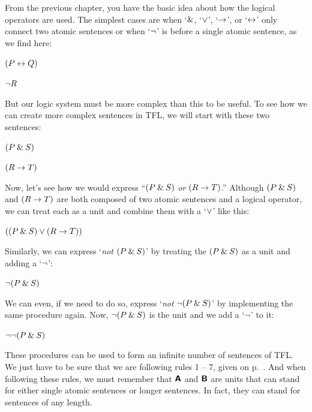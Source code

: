 From the previous chapter, you have the basic idea about how the logical operators are used. The simplest cases are when `$\mathbin{\&}$, `$\vee$', `$\rightarrow$', or `$\leftrightarrow$' only connect two atomic sentences or when `${\neg}$' is before a single atomic sentence, as we find here:  
\begin{earg}
\item[] $(P \leftrightarrow Q)$
\item[] ${\neg} R$
\end{earg}
But our logic system must be more complex than this to be useful. To see how we can create more complex sentences in TFL, we will start with these two sentences:
\begin{earg}
\item[] $(P \mathbin{\&} S)$
\item[] $(R \rightarrow T)$
\end{earg}
Now, let’s see how we would express ``$(P \mathbin{\&} S)$ \textit{or} $(R \rightarrow T)$.'' Although 
$(P \mathbin{\&} S)$ and
$(R \rightarrow T)$
are both composed of two atomic sentences and a logical operator, we can treat each as a unit and combine them with a `$\vee$’ like this:
\begin{earg}
\item[]$((P \mathbin{\&} S) \vee (R \rightarrow T))$
\end{earg}
\noindent Similarly, we can express `\textit{not} $(P \mathbin{\&} S)$' by treating the $(P \mathbin{\&} S)$ as a unit and adding a `${\neg}$’:
\begin{earg}
\item[] ${\neg}(P \mathbin{\&} S)$
\end{earg}
We can even, if we need to do so, express `\textit{not} ${\neg}(P \mathbin{\&} S)$' by implementing the same procedure again. Now, ${\neg}(P \mathbin{\&} S)$ is the unit and we add a `${\neg}$’ to it:
\begin{earg}
\item[] ${\neg}{\neg}(P \mathbin{\&} S)$
\end{earg}

These procedures can be used to form an infinite number of sentences of TFL. We just have to be sure that we are following rules 1 -- 7, given on p.~\pageref{TFLsentences}.  And when following these rules, we must remember that $\bm{\mathsf{A}}$ and $\bm{\mathsf{B}}$ are units that can stand for either single atomic sentences or longer sentences. In fact, they can stand for sentences of any length.

